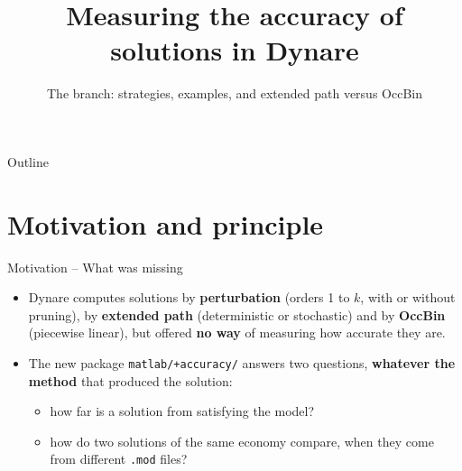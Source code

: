 \documentclass[11pt,aspectratio=169]{beamer}
\title{Measuring the accuracy of solutions in Dynare}
\subtitle{The \code{accuracy} branch: strategies, examples, and extended path versus OccBin}
\author{}
\date{}
\institute{}
\newcommand{\code}[1]{\texttt{#1}}
\begin{document}
\begin{frame}
\titlepage
\end{frame}

\begin{frame}{Outline}
\tableofcontents
\end{frame}

\section{Motivation and principle}

\begin{frame}{Motivation -- What was missing}

\begin{itemize}

\item Dynare computes solutions by \textbf{perturbation} (orders 1 to $k$, with or without pruning), by \textbf{extended path} (deterministic or stochastic) and by \textbf{OccBin} (piecewise linear), but offered \textbf{no way} of measuring how accurate they are.\newline

\item The new package \code{matlab/+accuracy/} answers two questions, \textbf{whatever the method} that produced the solution:\newline
  \begin{itemize}

  \item how far is a solution from satisfying the model?\newline

  \item how do two solutions of the same economy compare, when they come from different \code{.mod} files?

  \end{itemize}

\end{itemize}

\end{frame}
\end{document}

